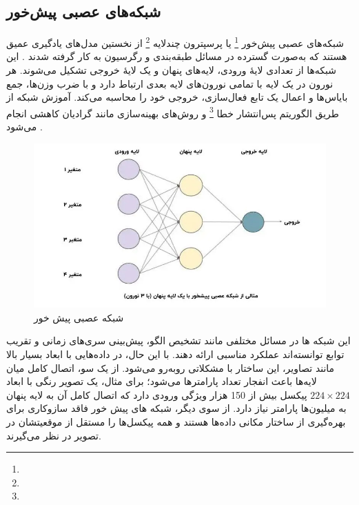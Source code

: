 \subsection{شبکه‌های عصبی پیش‌خور}
شبکه‌های عصبی پیش‌خور \footnote{} یا پرسپترون چندلایه \footnote{} از نخستین مدل‌های یادگیری عمیق هستند که به‌صورت گسترده در مسائل طبقه‌بندی و رگرسیون به کار گرفته شدند \cite{bishop2006pattern}. این شبکه‌ها از تعدادی لایهٔ ورودی، لایه‌های پنهان و یک لایهٔ خروجی تشکیل می‌شوند. هر نورون در یک لایه با تمامی نورون‌های لایه بعدی ارتباط دارد و با ضرب وزن‌ها، جمع بایاس‌ها و اعمال یک تابع فعال‌سازی، خروجی خود را محاسبه می‌کند. آموزش شبکه از طریق الگوریتم پس‌انتشار خطا \footnote{} و روش‌های بهینه‌سازی مانند گرادیان کاهشی انجام می‌شود \cite{rumelhart1986learning}.  



\begin{figure}[h]
	\centering
	\begin{minipage}[b]{0.8\textwidth}
		\centering
		\includegraphics[width=\textwidth]{transformer_images/mlp_new_11zon.jpg}
		\caption{شبکه عصبی پیش خور}
		\label{fig:milti layer perceptron}
	\end{minipage}
	\hfill
\end{figure}





این شبکه ها در مسائل مختلفی مانند تشخیص الگو، پیش‌بینی سری‌های زمانی و تقریب توابع توانسته‌اند عملکرد مناسبی ارائه دهند. با این حال، در داده‌هایی با ابعاد بسیار بالا مانند تصاویر، این ساختار با مشکلاتی روبه‌رو می‌شود. از یک سو، اتصال کامل میان لایه‌ها باعث انفجار تعداد پارامترها می‌شود؛ برای مثال، یک تصویر رنگی با ابعاد \(224 \times 224\) پیکسل بیش از 150 هزار ویژگی ورودی دارد که اتصال کامل آن به لایه پنهان به میلیون‌ها پارامتر نیاز دارد. از سوی دیگر، شبکه های پیش خور فاقد سازوکاری برای بهره‌گیری از ساختار مکانی داده‌ها هستند و همه پیکسل‌ها را مستقل از موقعیتشان در تصویر در نظر می‌گیرند.


